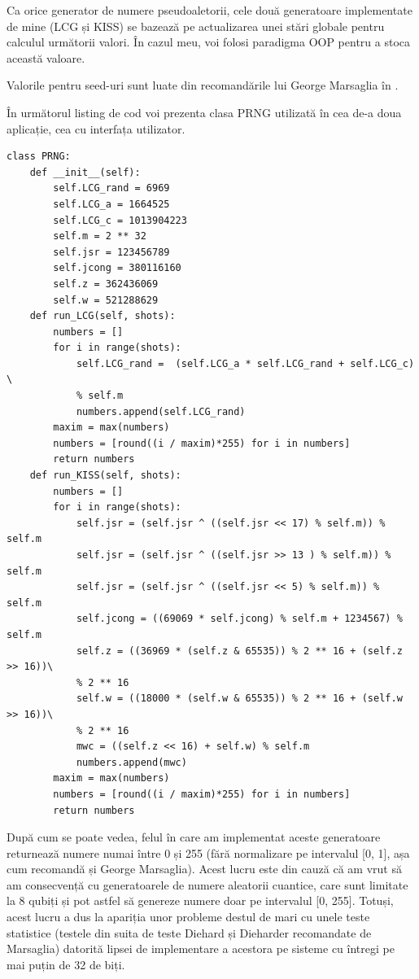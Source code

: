 Ca orice generator de numere pseudoaletorii, cele două generatoare implementate de mine (LCG și KISS) se bazează pe actualizarea unei stări globale pentru calculul următorii valori. În cazul meu, voi folosi paradigma OOP pentru a stoca această valoare.

Valorile pentru seed-uri sunt luate din recomandările lui George Marsaglia în \cite{misc:usenet:GeorgeMarsaglia}.

În următorul listing de cod voi prezenta clasa PRNG utilizată în cea de-a doua aplicație, cea cu interfața utilizator.

\begin{code}
\begin{verbatim}
class PRNG:
    def __init__(self):
        self.LCG_rand = 6969
        self.LCG_a = 1664525
        self.LCG_c = 1013904223
        self.m = 2 ** 32
        self.jsr = 123456789
        self.jcong = 380116160
        self.z = 362436069
        self.w = 521288629
    def run_LCG(self, shots):
        numbers = []
        for i in range(shots):
            self.LCG_rand =  (self.LCG_a * self.LCG_rand + self.LCG_c) \
            % self.m
            numbers.append(self.LCG_rand)
        maxim = max(numbers)
        numbers = [round((i / maxim)*255) for i in numbers]
        return numbers
    def run_KISS(self, shots):
        numbers = []
        for i in range(shots):
            self.jsr = (self.jsr ^ ((self.jsr << 17) % self.m)) % self.m
            self.jsr = (self.jsr ^ ((self.jsr >> 13 ) % self.m)) % self.m
            self.jsr = (self.jsr ^ ((self.jsr << 5) % self.m)) % self.m
            self.jcong = ((69069 * self.jcong) % self.m + 1234567) % self.m
            self.z = ((36969 * (self.z & 65535)) % 2 ** 16 + (self.z >> 16))\
            % 2 ** 16
            self.w = ((18000 * (self.w & 65535)) % 2 ** 16 + (self.w >> 16))\
            % 2 ** 16
            mwc = ((self.z << 16) + self.w) % self.m
            numbers.append(mwc)
        maxim = max(numbers)
        numbers = [round((i / maxim)*255) for i in numbers]
        return numbers
\end{verbatim}
\end{code}

După cum se poate vedea, felul în care am implementat aceste generatoare returnează numere numai între 0 și 255 (fără normalizare pe intervalul [0, 1], așa cum recomandă și George Marsaglia). Acest lucru este din cauză că am vrut să am consecvență cu generatoarele de numere aleatorii cuantice, care sunt limitate la 8 qubiți și pot astfel să genereze numere doar pe intervalul [0, 255]. Totuși, acest lucru a dus la apariția unor probleme destul de mari cu unele teste statistice (testele din suita de teste Diehard și Dieharder recomandate de Marsaglia) datorită lipsei de implementare a acestora pe sisteme cu întregi pe mai puțin de 32 de biți. 

